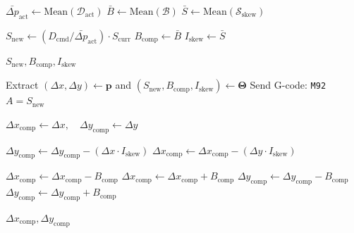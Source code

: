\begin{algorithm}[t]
\begin{algorithmic}[1]
		\State $\bar{\Delta p}_{\text{act}} \gets \text{Mean}(\mathcal{D}_{\text{act}})$
		\State $\bar{B} \gets \text{Mean}(\mathcal{B})$
		\State $\bar{S} \gets \text{Mean}(\mathcal{S}_{\text{skew}})$
		
		\State $S_{\text{new}} \gets (D_{\text{cmd}} / \bar{\Delta p}_{\text{act}}) \cdot S_{\text{curr}}$
		\State $B_{\text{comp}} \gets \bar{B}$
		\State $I_{\text{skew}} \gets \bar{S}$
		
		\State \Return $S_{\text{new}}, B_{\text{comp}}, I_{\text{skew}}$
		\EndFunction
		
		\Statex
		
		\State Extract $(\Delta x, \Delta y) \gets \mathbf{p}$ and $(S_{\text{new}}, B_{\text{comp}}, I_{\text{skew}}) \gets \mathbf{\Theta}$
		\State Send G-code: \texttt{M92} $A = S_{\text{new}}$
		\EndIf
		
		\State $\Delta x_{\text{comp}} \gets \Delta x, \quad \Delta y_{\text{comp}} \gets \Delta y$
		
		\State $\Delta y_{\text{comp}} \gets \Delta y_{\text{comp}} - (\Delta x \cdot I_{\text{skew}})$
		\State $\Delta x_{\text{comp}} \gets \Delta x_{\text{comp}} - (\Delta y \cdot I_{\text{skew}})$
		\EndIf
		
		\State $\Delta x_{\text{comp}} \gets \Delta x_{\text{comp}} - B_{\text{comp}}$
		\Else
		\State $\Delta x_{\text{comp}} \gets \Delta x_{\text{comp}} + B_{\text{comp}}$
		\EndIf
		\State $\Delta y_{\text{comp}} \gets \Delta y_{\text{comp}} - B_{\text{comp}}$
		\Else
		\State $\Delta y_{\text{comp}} \gets \Delta y_{\text{comp}} + B_{\text{comp}}$
		\EndIf
		\EndIf
		\EndIf
		
		\State \Return $\Delta x_{\text{comp}}, \Delta y_{\text{comp}}$
		\EndFunction
		
	\end{algorithmic}
\end{algorithm}

